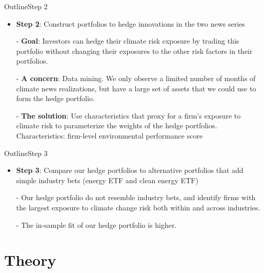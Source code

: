 \begin{frame}{Outline}{Step 2}
	\begin{itemize}
		\item \textbf{Step 2}: Construct portfolios to hedge innovations in the two news series
		\item [-] \textbf{Goal}: Investors can hedge their climate risk exposure by trading this portfolio without changing their exposures to the other risk factors in their portfolios.
		\item [-] \textbf{A concern}: Data mining. We only observe a limited number of months of climate news realizations, but have a large set of assets that we could use to form the hedge portfolio.
		\item [-] \textbf{The solution}: Use characteristics that proxy for a firm's exposure to climate risk to parameterize the weights of the hedge portfolios. Characteristics: firm-level environmental performance score
	\end{itemize}	
\end{frame}

\begin{frame}{Outline}{Step 3}
	\begin{itemize}
		\item \textbf{Step 3}: Compare our hedge portfolios to alternative portfolios that add simple industry bets (energy ETF and clean energy ETF)
		\item [-] Our hedge portfolio do not resemble industry bets, and identify firms with the largest exposure to climate change risk both within and across industries.
		\item [-] The in-sample fit of our hedge portfolio is higher.
	\end{itemize}	
\end{frame}


\section{Theory}

